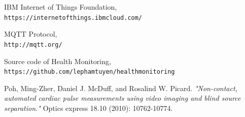 \begin{thebibliography}{99}

IBM Internet of Things Foundation,
\\\texttt{https://internetofthings.ibmcloud.com/}

MQTT Protocol,
\\\texttt{http://mqtt.org/}

Source code of Health Monitoring,
\\\texttt{https://github.com/lephamtuyen/healthmonitoring}

 Poh, Ming-Zher, Daniel J. McDuff, and Rosalind W. Picard. \emph{"Non-contact, automated cardiac pulse measurements using video imaging and blind source separation."} Optics express 18.10 (2010): 10762-10774.

\end{thebibliography}

